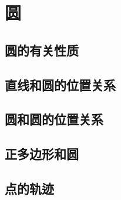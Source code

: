\chapter{圆}

\section{圆的有关性质}








\section{直线和圆的位置关系}








\section{圆和圆的位置关系}





\section{正多边形和圆}







\section{点的轨迹}







